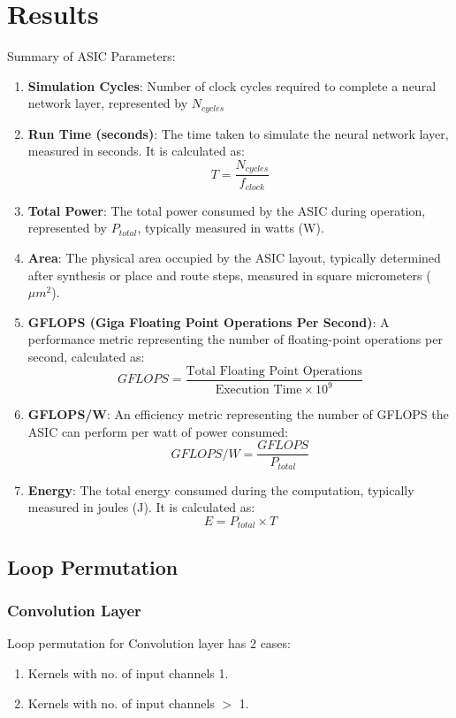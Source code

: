 \fancyhf{}
\fancyfoot[CO, CE]{ \thepage}

\chapter{Results}
\label{chapter4}

Summary of ASIC Parameters:
\begin{enumerate}
    \item \textbf{Simulation Cycles}:  
  Number of clock cycles required to complete a neural network layer, represented by \( N_{cycles} \)
\item \textbf{Run Time (seconds)}:  
The time taken to simulate the neural network layer, measured in seconds. It is calculated as:
\[
T = \frac{N_{cycles}}{f_{clock}}
\]
\item \textbf{Total Power}:  
The total power consumed by the ASIC during operation, represented by \( P_{total} \), typically measured in watts (W).

\item \textbf{Area}:  
The physical area occupied by the ASIC layout, typically determined after synthesis or place and route steps, measured in square micrometers (\(\mu m^2\)).

\item \textbf{GFLOPS (Giga Floating Point Operations Per Second)}:  
A performance metric representing the number of floating-point operations per second, calculated as:
\[
GFLOPS = \frac{\text{Total Floating Point Operations}}{\text{Execution Time} \times 10^9}
\]

\item \textbf{GFLOPS/W}:  
An efficiency metric representing the number of GFLOPS the ASIC can perform per watt of power consumed:
\[
GFLOPS/W = \frac{GFLOPS}{P_{total}}
\]

\item \textbf{Energy}:  
The total energy consumed during the computation, typically measured in joules (J). It is calculated as:
\[
E = P_{total} \times T
\]
\end{enumerate}

\section{Loop Permutation}
\subsection{Convolution Layer}
Loop permutation for Convolution layer has 2 cases:
\begin{enumerate}
 \item Kernels with no. of input channels 1.
 \item Kernels with no. of input channels $>$ 1.
\end{enumerate}

